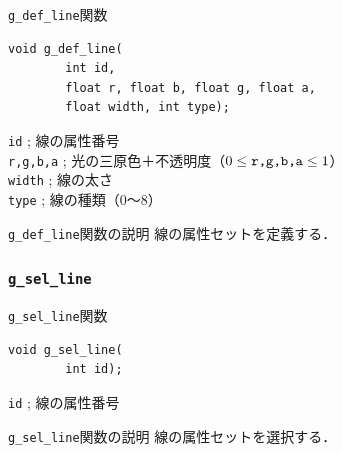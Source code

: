 \documentclass[platex,a4paper,12pt]{jsarticle}%
\begin{document}
\begin{itembox}[l]{\texttt{g\_def\_line}関数}
\begin{verbatim}
void g_def_line(
        int id,	
        float r, float b, float g, float a,
        float width, int type);
\end{verbatim}
\verb|id| ; 線の属性番号\\
\verb|r,g,b,a| ; 光の三原色＋不透明度（$0\leq \verb|r,g,b,a| \leq 1$）\\
\verb|width| ; 線の太さ\\
\verb|type| ; 線の種類（0〜8）
\end{itembox}

\begin{itembox}[l]{\texttt{g\_def\_line}関数の説明}
線の属性セットを定義する．
\end{itembox}

\begin{figure}[htb]
\end{figure}



\clearpage
\subsubsection{\texttt{g\_sel\_line}}

\begin{itembox}[l]{\texttt{g\_sel\_line}関数}
\begin{verbatim}
void g_sel_line(
        int id);
\end{verbatim}
\verb|id| ; 線の属性番号
\end{itembox}

\begin{itembox}[l]{\texttt{g\_sel\_line}関数の説明}
線の属性セットを選択する．
\end{itembox}
\end{document}
